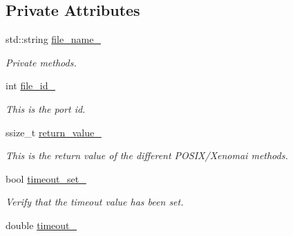 \subsection*{Private Attributes}
\begin{DoxyCompactItemize}
\item 
std\+::string \hyperlink{classreal__time__tools_1_1UsbStream_ac8d1e2727668e9549dda2038248943d5}{file\+\_\+name\+\_\+}
\begin{DoxyCompactList}\small\item\em Private methods. \end{DoxyCompactList}\item 
int \hyperlink{classreal__time__tools_1_1UsbStream_a52bf9e29fde33e865daef464a01738af}{file\+\_\+id\+\_\+}\hypertarget{classreal__time__tools_1_1UsbStream_a52bf9e29fde33e865daef464a01738af}{}\label{classreal__time__tools_1_1UsbStream_a52bf9e29fde33e865daef464a01738af}

\begin{DoxyCompactList}\small\item\em This is the port id. \end{DoxyCompactList}\item 
ssize\+\_\+t \hyperlink{classreal__time__tools_1_1UsbStream_a272dd207ec047d29b00e099bff188ac6}{return\+\_\+value\+\_\+}\hypertarget{classreal__time__tools_1_1UsbStream_a272dd207ec047d29b00e099bff188ac6}{}\label{classreal__time__tools_1_1UsbStream_a272dd207ec047d29b00e099bff188ac6}

\begin{DoxyCompactList}\small\item\em This is the return value of the different P\+O\+S\+I\+X/\+Xenomai methods. \end{DoxyCompactList}\item 
bool \hyperlink{classreal__time__tools_1_1UsbStream_a76378aaeca606027408ebd5c7f06e97e}{timeout\+\_\+set\+\_\+}\hypertarget{classreal__time__tools_1_1UsbStream_a76378aaeca606027408ebd5c7f06e97e}{}\label{classreal__time__tools_1_1UsbStream_a76378aaeca606027408ebd5c7f06e97e}

\begin{DoxyCompactList}\small\item\em Verify that the timeout value has been set. \end{DoxyCompactList}\item 
double \hyperlink{classreal__time__tools_1_1UsbStream_afa70d692f2715d9a42e1a2d3a91f876a}{timeout\+\_\+}\hypertarget{classreal__time__tools_1_1UsbStream_afa70d692f2715d9a42e1a2d3a91f876a}{}\label{classreal__time__tools_1_1UsbStream_afa70d692f2715d9a42e1a2d3a91f876a}


\end{DoxyCompactItemize}
